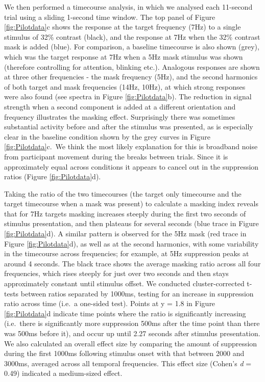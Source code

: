 \documentclass[
]{article}
\begin{document}
We then performed a timecourse analysis, in which we analysed each 11-second trial using a sliding 1-second time window. The top panel of Figure \ref{fig:Pilotdata}c shows the response at the target frequency (7Hz) to a single stimulus of 32\% contrast (black), and the response at 7Hz when the 32\% contrast mask is added (blue). For comparison, a baseline timecourse is also shown (grey), which was the target response at 7Hz when a 5Hz mask stimulus was shown (therefore controlling for attention, blinking etc.). Analogous responses are shown at three other frequencies - the mask frequency (5Hz), and the second harmonics of both target and mask frequencies (14Hz, 10Hz), at which strong responses were also found (see spectra in Figure \ref{fig:Pilotdata}b). The reduction in signal strength when a second component is added at a different orientation and frequency illustrates the masking effect. Surprisingly there was sometimes substantial activity before and after the stimulus was presented, as is especially clear in the baseline condition shown by the grey curves in Figure \ref{fig:Pilotdata}c.~We think the most likely explanation for this is broadband noise from participant movement during the breaks between trials. Since it is approximately equal across conditions it appears to cancel out in the suppression ratios (Figure \ref{fig:Pilotdata}d).

Taking the ratio of the two timecourses (the target only timecourse and the target timecourse when a mask was present) to calculate a masking index reveals that for 7Hz targets masking increases steeply during the first two seconds of stimulus presentation, and then plateaus for several seconds (blue trace in Figure \ref{fig:Pilotdata}d). A similar pattern is observed for the 5Hz mask (red trace in Figure \ref{fig:Pilotdata}d), as well as at the second harmonics, with some variability in the timecourse across frequencies; for example, at 5Hz suppression peaks at around 4 seconds. The black trace shows the average masking ratio across all four frequencies, which rises steeply for just over two seconds and then stays approximately constant until stimulus offset. We conducted cluster-corrected t-tests between ratios separated by 1000ms, testing for an increase in suppression ratio across time (i.e.~a one-sided test). Points at y = 1.8 in Figure \ref{fig:Pilotdata}d indicate time points where the ratio is significantly increasing (i.e.~there is significantly more suppression 500ms after the time point than there was 500ms before it), and occur up until 2.27 seconds after stimulus presentation. We also calculated an overall effect size by comparing the amount of suppression during the first 1000ms following stimulus onset with that between 2000 and 3000ms, averaged across all temporal frequencies. This effect size (Cohen's \emph{d} = 0.49) indicated a medium-sized effect.
\end{document}
